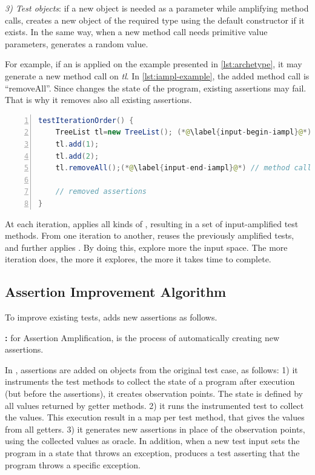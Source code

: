 \emph{3) Test objects}:
if a new object is needed as a parameter while amplifying method calls, \dspot creates a new object of the required type using the default constructor if it exists.
In the same way, when a new method call needs primitive value parameters, \dspot generates a random value.

For example, if an \Iampl is applied on the example presented in \autoref{lst:archetype}, it may generate a new method call on \emph{tl}.
In \autoref{lst:iampl-example}, the added method call is ``removeAll''.
Since \dspot changes the state of the program, existing assertions may fail. 
That is why it removes also all existing assertions.

\begin{lstlisting}[caption={An example of an \Iampl{}: the amplification added a method call to \emph{removeAll()} on \emph{tl}.},label=lst:iampl-example,float,language=java,numbers=left] 
testIterationOrder() {
	TreeList tl=new TreeList(); (*@\label{input-begin-iampl}@*)
	tl.add(1);
	tl.add(2);
	tl.removeAll();(*@\label{input-end-iampl}@*) // method call added
	
	// removed assertions
}
\end{lstlisting}

At each iteration, \dspot applies all kinds of \Iampl, resulting in a set of input-amplified test methods. 
From one iteration to another, \dspot reuses the previously amplified tests, and further applies \Iampl.
By doing this, \dspot explore more the input space.
The more iteration \dspot does, the more it explores, the more it takes time to complete.

\subsection{Assertion Improvement Algorithm}
\label{subsec:dspot:algorithm:new-assertions}

To improve existing tests, \dspot adds new assertions as follows.

\textbf{\Aampl:} for Assertion Amplification, is the process of automatically creating new assertions.

In \dspot, assertions are added on objects from the original test case, as follows: 
1) it instruments the test methods to collect the state of a program after execution (but before the assertions), \ie it creates observation points. 
The state is defined by all values returned by getter methods.
2) it runs the instrumented test to collect the values.
This execution result in a map per test method, that gives the values from all getters.
3) it generates new assertions in place of the observation points, using the collected values as oracle. 
In addition, when a new test input sets the program in a state that throws an exception, \dspot produces a test asserting that the program throws a specific exception.

